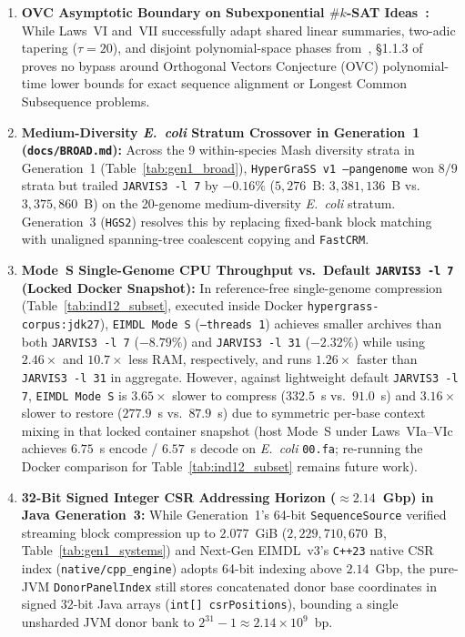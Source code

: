 \documentclass[10pt]{article}
\theoremstyle{definition}
\begin{document}
\begin{enumerate}
  \item \textbf{OVC Asymptotic Boundary on Subexponential $\#k$-SAT Ideas~\cite{openai2026eth}:}
  While Laws~VI and~VII successfully adapt shared linear summaries, two-adic tapering ($\tau=20$), and disjoint polynomial-space phases from~\cite{openai2026eth}, \S1.1.3 of~\cite{openai2026eth} proves no bypass around Orthogonal Vectors Conjecture (OVC) polynomial-time lower bounds for exact sequence alignment or Longest Common Subsequence problems.
  \item \textbf{Medium-Diversity \textit{E.~coli} Stratum Crossover in Generation~1 (\texttt{docs/BROAD.md}):}
  Across the 9 within-species Mash diversity strata in Generation~1 (Table~\ref{tab:gen1_broad}), \texttt{HyperGraSS v1 --pangenome} won $8/9$ strata but trailed \texttt{JARVIS3 -l 7} by $-0.16\%$ ($5,276$~B: $3,381,136$~B vs.\ $3,375,860$~B) on the 20-genome medium-diversity \textit{E.~coli} stratum. Generation~3 (\texttt{HGS2}) resolves this by replacing fixed-bank block matching with unaligned spanning-tree coalescent copying and \texttt{FastCRM}.
  \item \textbf{Mode~S Single-Genome CPU Throughput vs.\ Default \texttt{JARVIS3 -l 7} (Locked Docker Snapshot):}
  In reference-free single-genome compression (Table~\ref{tab:ind12_subset}, executed inside Docker \texttt{hypergrass-corpus:jdk27}), \texttt{EIMDL Mode~S} (\texttt{--threads 1}) achieves smaller archives than both \texttt{JARVIS3 -l 7} ($-8.79\%$) and \texttt{JARVIS3 -l 31} ($-2.32\%$) while using $2.46\times$ and $10.7\times$ less RAM, respectively, and runs $1.26\times$ faster than \texttt{JARVIS3 -l 31} in aggregate. However, against lightweight default \texttt{JARVIS3 -l 7}, \texttt{EIMDL Mode~S} is $3.65\times$ slower to compress ($332.5$~s vs.\ $91.0$~s) and $3.16\times$ slower to restore ($277.9$~s vs.\ $87.9$~s) due to symmetric per-base context mixing in that locked container snapshot (host Mode~S under Laws~VIa--VIc achieves $6.75$~s encode / $6.57$~s decode on \textit{E.~coli} \texttt{00.fa}; re-running the Docker comparison for Table~\ref{tab:ind12_subset} remains future work).
  \item \textbf{32-Bit Signed Integer CSR Addressing Horizon ($\approx 2.14$~Gbp) in Java Generation~3:}
  While Generation~1's 64-bit \texttt{SequenceSource} verified streaming block compression up to $2.077$~GiB ($2,229,710,670$~B, Table~\ref{tab:gen1_systems}) and Next-Gen EIMDL~v3's \texttt{C++23} native CSR index (\texttt{native/cpp\_engine}) adopts 64-bit indexing above $2.14$~Gbp, the pure-JVM \texttt{DonorPanelIndex} still stores concatenated donor base coordinates in signed 32-bit Java arrays (\texttt{int[] csrPositions}), bounding a single unsharded JVM donor bank to $2^{31}-1 \approx 2.14\times 10^9$~bp.

\end{enumerate}
\end{document}
